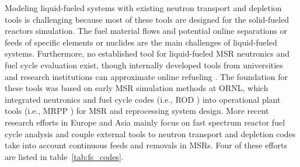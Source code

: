 Modeling liquid-fueled systems with existing neutron transport and depletion tools is challenging because most of these tools are designed for the solid-fueled reactors simulation. The fuel material flows and potential online separations or feeds of specific elements or nuclides are the main challenges
of liquid-fueled systems. Furthermore, no established tool for liquid-fueled \gls{MSR} neutronics and fuel cycle evaluation exist, though internally developed tools from universities and research institutions can approximate online refueling \cite{serp_molten_2014}. The foundation for these tools was based on early \gls{MSR} simulation methods at \gls{ORNL}, which integrated neutronics and fuel cycle codes (i.e., ROD \cite{bauman_rod:_1971}) into operational plant tools (i.e., MRPP \cite{kee_mrpp:_1976}) for \gls{MSR} and reprocessing system design. More recent research efforts in Europe and Asia mainly focus on fast spectrum reactor fuel cycle analysis and couple external tools to neutron transport and depletion codes take into account continuous feeds and removals in \glspl{MSR}. Four of these efforts are listed in table~\ref{tab:fs_codes}.

